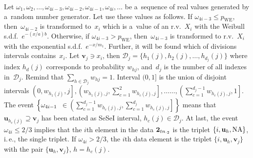 \begin{multicols}{2}
 Let $\omega_1, \omega_2, \ldots, \omega_{4i-3}, \omega_{4i-2}, 
 \omega_{4i-1}, \omega_{4i}, \ldots$
 be a~sequence of real values generated by a~random number generator. Let use these values as follows.
If  $\omega_{4i-3} \le p_{\mathrm{WE}}$, then~$\omega_{4i-2}$ is transformed to~$x_i$ 
which is a~value of an r.v.~$X_i$ with the Weibull s.d.f.~$e^{-(x/a)b}$. 
Otherwise, if $\omega_{4i-3}> p_{\mathrm{WE}}$, then~$\omega_{4i-3}$
is transformed to r.v.~$X_i$ with the exponential s.d.f.~$e^{-x/m_1}$. 
Further, it will be found which of divisions intervals contains~$x_i.$
 Let $\mathbf{v}_j \ni x_i$, then $\mathcal{D}_j =\{ h_1(j), h_2 (j), \ldots, h_{d_j}(j)\}$ 
 where index $h_d(j)$
 corresponds to probability $w_{hj}$, and~$d_j$ is the number of all indexes 
 in~$\mathcal{D}_j.$
 Remind that $\sum_{h\in\mathcal{D}_j} w_{hj}  =1$. 
 Interval $(0, 1]$ is the union of disjoint intervals
$\left( 0, w_{h_1(j)}, j \right], \left (w_{h_1(j),j}, 
\sum\nolimits_{c=1}^2  w_{h_c (j), j} \right ] , \ldots$\linebreak $\ldots,  \left ( 
\sum\nolimits_{c=1}^{d_j-1}  w_{h_c (j), j} , 1 \right ]$.
 The event $\left\{ \vphantom{\sum_{c=1}^{d_j-1}}\omega_{4i-1}\right.$\linebreak 
 $\left. \in \left ( \sum_{c=1}^{d_j-1}  w_{h_c (j), j} ,
\sum_{c=1}^{d_j}  w_{h_c (j), j} \right]
\right\}$
  means that $\mathbf{u}_{h_c (j)} \supseteq \mathbf{v}_j$ has been stated as SeSeI interval, 
  $h_c(j)\in\mathcal{D}_j.$
  At last, the event $\omega_{4i} \le 2/3$ implies that the $i$th element in the data ${\bf 2}_{t n_{\cdot 2}}$
  is the triplet $\{ i, {\bf u}_h, \mathrm{NA}\}$, i.\,e.,
  the single triplet. If $\omega_{4i} > 2/3$,  the $i$th
  data element  is the triplet $\{ i, \mathbf{u}_h, \mathbf{v}_j\} $ with the pair 
  $\{ \mathbf{u}_h, \mathbf{v}_j\}$, $h=h_c(j)$.


\end{multicols}
